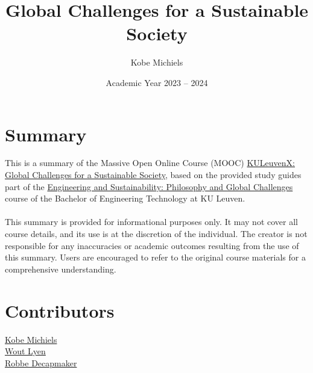 \documentclass[kul]{kulakarticle} %
\title{Global Challenges for a Sustainable Society}
\author{Kobe Michiels}
\date{Academic Year 2023 -- 2024}
\begin{document}
\maketitle

\section*{Summary}

This is a summary of the Massive Open Online Course (MOOC) \href{https://www.edx.org/learn/science/ku-leuven-global-challenges-for-a-sustainable-society?webview=false&campaign=Global+Challenges+for+a+Sustainable+Society&source=edx&product_category=course&placement_url=https%3A%2F%2Fwww.edx.org%2Fschool%2Fkuleuvenx}{KULeuvenX: Global Challenges for a Sustainable Society}, based on the provided study guides part of the \href{https://onderwijsaanbod.kuleuven.be/syllabi/v/e/T3AID1E.htm#activetab=inhoud_idp1690064}{Engineering and Sustainability: Philosophy and Global Challenges} course of the Bachelor of Engineering Technology at KU Leuven.
\\\\
This summary is provided for informational purposes only. It may not cover all course details, and its use is at the discretion of the individual. The creator is not responsible for any inaccuracies or academic outcomes resulting from the use of this summary. Users are encouraged to refer to the original course materials for a comprehensive understanding.

\section*{Contributors}
\href{https://github.com/michielskobe}{Kobe Michiels}\\
\href{https://github.com/woutlyen}{Wout Lyen}\\
\href{https://github.com/debber1}{Robbe Decapmaker}\\
\newpage

\newpage
\setcounter{tocdepth}{2}
\tableofcontents
\newpage

\newpage

\newpage

\newpage

\newpage

\newpage

\newpage

\newpage

\newpage

\newpage

\newpage

\newpage

\newpage

\end{document}

